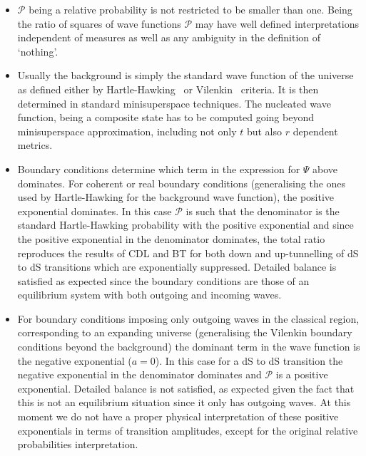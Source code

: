 \documentclass[11pt,a4paper]{article}
\begin{document}
\begin{itemize}
\item{} $\mathcal{P}$ being a relative probability is not restricted to be smaller than one. Being the ratio of squares of wave functions $\mathcal{P} $ may have well defined interpretations independent of measures as well as any ambiguity in the definition of `nothing'.
\item{} Usually the background is simply the standard wave function of the universe as defined either by Hartle-Hawking~\cite{Hartle:1983ai} or Vilenkin~\cite{Vilenkin:1982de, Vilenkin:1984wp} criteria. It is then determined in standard minisuperspace techniques. The nucleated wave function, being a composite state has to be computed going beyond minisuperspace approximation, including not only $t$ but also $r$ dependent metrics.
\item{} Boundary conditions determine which term in the expression for $\Psi$ above dominates. For coherent or real boundary conditions (generalising the ones used by Hartle-Hawking for the background wave function), the positive exponential dominates. In this case $\mathcal{P}$ is such that the denominator is the standard Hartle-Hawking probability with the  positive exponential and since the positive exponential in the denominator dominates, the total ratio reproduces the results of CDL and BT for both down and up-tunnelling of dS to dS transitions which are exponentially suppressed. Detailed balance is satisfied as expected since the boundary conditions are those of an equilibrium system with both outgoing and incoming waves. 
\item{} For boundary conditions imposing only outgoing waves in the classical region, corresponding to an expanding universe (generalising the Vilenkin boundary conditions beyond the background) the dominant term in the wave function is the negative exponential ($a=0$). In this case for a dS to dS transition the negative exponential in the denominator dominates and $\mathcal{P}$ is a positive exponential. Detailed balance is not satisfied, as expected given the fact that this is not an equilibrium situation since it  only has outgoing waves. At this moment we do not have a proper physical interpretation of these positive exponentials in terms of transition amplitudes, except for the original relative probabilities interpretation.
 \end{itemize}
\end{document}
